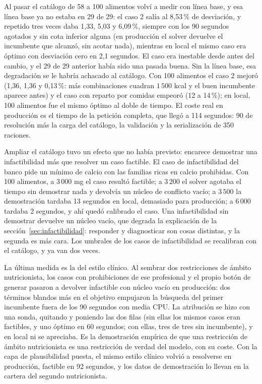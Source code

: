Al pasar el catálogo de 58 a 100 alimentos volví a medir con línea base, y esa línea base ya no estaba en 29 de 29: el caso 2 salía al 8,53\,\% de desviación, y repetido tres veces daba 1,33, 5,03 y 6,09\,\%, siempre con los 90 segundos agotados y sin cota inferior alguna (en producción el solver devuelve el incumbente que alcanzó, sin acotar nada), mientras en local el mismo caso era óptimo con desviación cero en 2,1 segundos. El caso era inestable desde antes del cambio, y el 29 de 29 anterior había sido una pasada buena. Sin la línea base, esa degradación se le habría achacado al catálogo. Con 100 alimentos el caso 2 mejoró (1,36, 1,36 y 0,13\,\%: más combinaciones cuadran $1\,500$ kcal y el buen incumbente aparece antes) y el caso con reparto por comidas empeoró (12 a 14\,\%); en local, 100 alimentos fue el mismo óptimo al doble de tiempo. El coste real en producción es el tiempo de la petición completa, que llegó a 114 segundos: 90 de resolución más la carga del catálogo, la validación y la serialización de 350 raciones.

Ampliar el catálogo tuvo un efecto que no había previsto: encarece demostrar una infactibilidad más que resolver un caso factible. El caso de infactibilidad del banco pide un mínimo de calcio con las familias ricas en calcio prohibidas. Con 100 alimentos, a $3\,000$ mg el caso resultó factible; a $3\,200$ el solver agotaba el tiempo sin demostrar nada y devolvía un núcleo de conflicto vacío; a $3\,500$ la demostración tardaba 13 segundos en local, demasiado para producción; a $6\,000$ tardaba 2 segundos, y ahí quedó calibrado el caso. Una infactibilidad sin demostrar devuelve un núcleo vacío, que degrada la explicación de la sección~\ref{sec:infactibilidad}: responder y diagnosticar son cosas distintas, y la segunda es más cara. Los umbrales de los casos de infactibilidad se recalibran con el catálogo, y ya van dos veces.

La última medida es la del estilo clínico. Al sembrar dos restricciones de ámbito nutricionista, los casos con prohibiciones de ese profesional y el propio botón de generar pasaron a devolver infactible con núcleo vacío en producción: dos términos blandos más en el objetivo empujaron la búsqueda del primer incumbente fuera de los 90 segundos con media CPU. La atribución se hizo con una sonda, quitando y poniendo las dos filas (sin ellas los mismos casos eran factibles, y uno óptimo en 60 segundos; con ellas, tres de tres sin incumbente), y en local ni se apreciaba. Es la demostración empírica de que una restricción de ámbito nutricionista es una restricción de verdad del modelo, con su coste. Con la capa de plausibilidad puesta, el mismo estilo clínico volvió a resolverse en producción, factible en 92 segundos, y los datos de demostración lo llevan en la cartera del segundo nutricionista.

